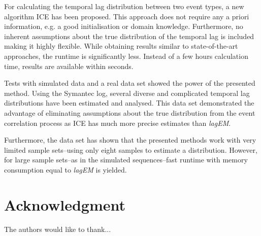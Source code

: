 \documentclass[conference]{IEEEtran}
\theoremstyle{examplestyle}
\begin{document}
For calculating the temporal lag distribution between two event types, a new algorithm \ac{ICE} has been proposed. This approach does not require any a priori information, e.g. a good initialisation or domain knowledge. Furthermore, no inherent assumptions about the true distribution of the temporal lag is included making it highly flexible. While obtaining results similar to state-of-the-art approaches, the runtime is significantly less. Instead of a few hours calculation time, results are available within seconds.

Tests with simulated data and a real data set showed the power of the presented method. Using the Symantec log, several diverse and complicated temporal lag distributions have been estimated and analysed. This data set demonstrated the advantage of eliminating assumptions about the true distribution from the event correlation process as \ac{ICE} has much more precise estimates than \textit{lagEM}.

Furthermore, the data set has shown that the presented methods work with very limited sample sets--using only eight samples to estimate a distribution. However, for large sample sets--as in the simulated sequences--fast runtime with memory consumption equal to \textit{lagEM} is yielded.





\section*{Acknowledgment}


The authors would like to thank...










\end{document}
